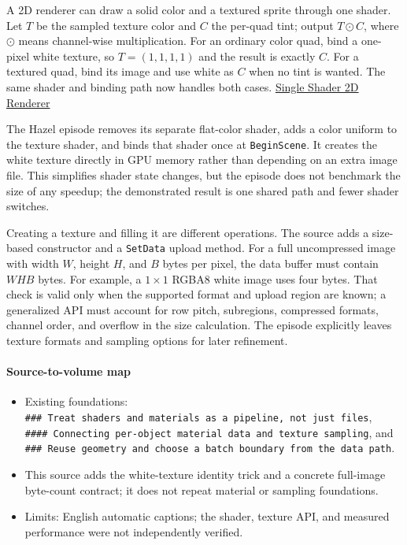 A 2D renderer can draw a solid color and a textured sprite through one shader. Let \(T\) be the sampled texture color and \(C\) the per-quad tint; output \(T\odot C\), where \(\odot\) means channel-wise multiplication. For an ordinary color quad, bind a one-pixel white texture, so \(T=(1,1,1,1)\) and the result is exactly \(C\). For a textured quad, bind its image and use white as \(C\) when no tint is wanted. The same shader and binding path now handles both cases. \href{https://www.youtube.com/watch?v=-myXuS3t1W4}{Single Shader 2D Renderer}

The Hazel episode removes its separate flat-color shader, adds a color uniform to the texture shader, and binds that shader once at \texttt{BeginScene}. It creates the white texture directly in GPU memory rather than depending on an extra image file. This simplifies shader state changes, but the episode does not benchmark the size of any speedup; the demonstrated result is one shared path and fewer shader switches.

Creating a texture and filling it are different operations. The source adds a size-based constructor and a \texttt{SetData} upload method. For a full uncompressed image with width \(W\), height \(H\), and \(B\) bytes per pixel, the data buffer must contain \(W H B\) bytes. For example, a \(1\times1\) RGBA8 white image uses four bytes. That check is valid only when the supported format and upload region are known; a generalized API must account for row pitch, subregions, compressed formats, channel order, and overflow in the size calculation. The episode explicitly leaves texture formats and sampling options for later refinement.

\paragraph{Source-to-volume map}\label{source-to-volume-map}

\begin{itemize}
\tightlist
\item
  Existing foundations: \texttt{\#\#\#\ Treat\ shaders\ and\ materials\ as\ a\ pipeline,\ not\ just\ files}, \texttt{\#\#\#\#\ Connecting\ per-object\ material\ data\ and\ texture\ sampling}, and \texttt{\#\#\#\ Reuse\ geometry\ and\ choose\ a\ batch\ boundary\ from\ the\ data\ path}.
\item
  This source adds the white-texture identity trick and a concrete full-image byte-count contract; it does not repeat material or sampling foundations.
\item
  Limits: English automatic captions; the shader, texture API, and measured performance were not independently verified.
\end{itemize}

